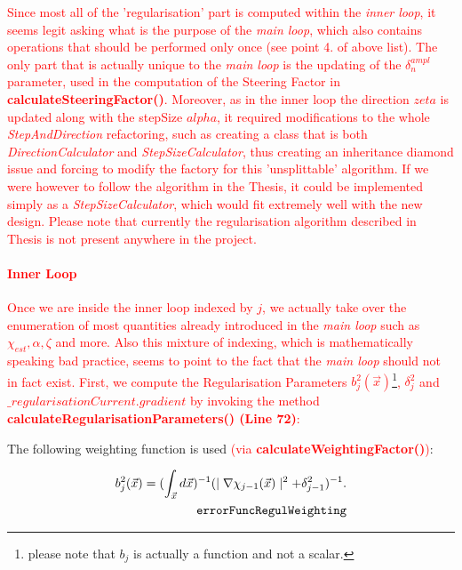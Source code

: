 \documentclass[10pt,a4paper]{article}
\begin{document}
\textcolor{red}{
Since most all of the 'regularisation' part is computed within the \textit{inner loop}, it seems legit asking what is the purpose of the \textit{main loop}, which also contains operations that should be performed only once (see point 4. of above list).
The only part that is actually unique to the \textit{main loop} is the updating of the $\delta^{ampl}_n$ parameter, used in the computation of the Steering Factor in \textbf{calculateSteeringFactor()}.
\newline
Moreover, as in the inner loop the direction $zeta$ is updated along with the stepSize $alpha$, it required modifications to the whole \textit{StepAndDirection} refactoring, such as creating a class that is both \textit{DirectionCalculator} and \textit{StepSizeCalculator}, thus creating an inheritance diamond issue and forcing to modify the factory for this 'unsplittable' algorithm.
If we were however to follow the algorithm in the Thesis, it could be implemented simply as a \textit{StepSizeCalculator}, which would fit extremely well with the new design.
Please note that currently the regularisation algorithm described in Thesis is not present anywhere in the project.
\newline
}

\textcolor{red}{
\paragraph{Inner Loop}
Once we are inside the inner loop indexed by $j$, we actually take over the enumeration of most quantities already introduced in the \textit{main loop} such as $\chi_{est}, \alpha, \zeta$ and more. Also this mixture of indexing, which is mathematically speaking bad practice, seems to point to the fact that the \textit{main loop} should not in fact exist.
\newline
First, we compute the Regularisation Parameters $b^2_j(\vec{x})$\footnote{please note that $b_j$ is actually a function and not a scalar.}, $\delta^2_j$  and $\_regularisationCurrent.gradient$ by invoking the method \textbf{calculateRegularisationParameters() (Line 72)}:
}

The following weighting function is used \textcolor{red}{(via \textbf{calculateWeightingFactor()})}:

\begin{align} \label{eq:errorFuncRegulWeighting} b_j^{2}(\vec{x}) = (\int_{\vec{x}}
d\vec{x})^{-1} (\mid\nabla\chi_{j-1}(\vec{x})\mid^2 + \delta_{j-1}^2)^{-1}.\\
\tag*{\texttt{errorFuncRegulWeighting}}
\end{align}
\end{document}
